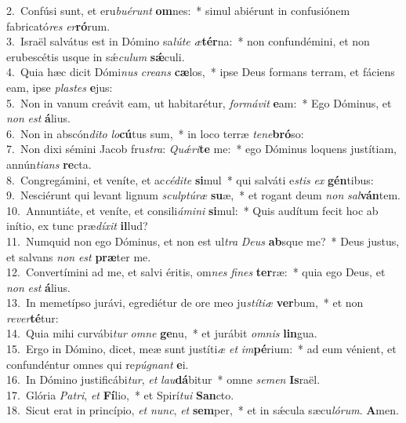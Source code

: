 {2.~}Confúsi sunt, et eru\textit{bu}\textit{é}\textit{runt} \textbf{om}nes:~* simul abiérunt in confusiónem fabricató\textit{res} \textit{er}\textbf{ró}rum.\\
{3.~}Israël salvátus est in Dómino sa\textit{lú}\textit{te} \textit{æ}\textbf{tér}na:~* non confundémini, et non erubescétis usque in sǽ\textit{cu}\textit{lum} \textbf{sǽ}culi.\\
{4.~}Quia hæc dicit Dómi\textit{nus} \textit{cre}\textit{ans} \textbf{cæ}los,~* ipse Deus formans terram, et fáciens eam, ipse \textit{pla}\textit{stes} \textbf{e}jus:\\
{5.~}Non in vanum creávit eam, ut habitarétur, \textit{for}\textit{má}\textit{vit} \textbf{e}am:~* Ego Dóminus, et \textit{non} \textit{est} \textbf{á}lius.\\
{6.~}Non in abscón\textit{di}\textit{to} \textit{lo}\textbf{cú}tus sum,~* in loco terræ \textit{te}\textit{ne}\textbf{bró}so:\\
{7.~}Non dixi sémini Jacob fru\textit{stra}: \textit{Quǽ}\textit{ri}\textbf{te} me:~* ego Dóminus loquens justítiam, annún\textit{ti}\textit{ans} \textbf{re}cta.\\
{8.~}Congregámini, et veníte, et ac\textit{cé}\textit{di}\textit{te} \textbf{si}mul~* qui salváti e\textit{stis} \textit{ex} \textbf{gén}tibus:\\
{9.~}Nesciérunt qui levant lignum \textit{scul}\textit{ptú}\textit{ræ} \textbf{su}æ,~* et rogant deum \textit{non} \textit{sal}\textbf{ván}tem.\\
{10.~}Annuntiáte, et veníte, et consili\textit{á}\textit{mi}\textit{ni} \textbf{si}mul:~* Quis audítum fecit hoc ab inítio, ex tunc præ\textit{dí}\textit{xit} \textbf{il}lud?\\
{11.~}Numquid non ego Dóminus, et non est ul\textit{tra} \textit{De}\textit{us} \textbf{ab}sque me?~* Deus justus, et salvans \textit{non} \textit{est} \textbf{præ}ter me.\\
{12.~}Convertímini ad me, et salvi éritis, om\textit{nes} \textit{fi}\textit{nes} \textbf{ter}ræ:~* quia ego Deus, et \textit{non} \textit{est} \textbf{á}lius.\\
{13.~}In memetípso jurávi, egrediétur de ore meo ju\textit{stí}\textit{ti}\textit{æ} \textbf{ver}bum,~* et non \textit{re}\textit{ver}\textbf{té}tur:\\
{14.~}Quia mihi curvábi\textit{tur} \textit{om}\textit{ne} \textbf{ge}nu,~* et jurábit \textit{om}\textit{nis} \textbf{lin}gua.\\
{15.~}Ergo in Dómino, dicet, meæ sunt justíti\textit{æ} \textit{et} \textit{im}\textbf{pé}rium:~* ad eum vénient, et confundéntur omnes qui re\textit{pú}\textit{gnant} \textbf{e}i.\\
{16.~}In Dómino justificábi\textit{tur}, \textit{et} \textit{lau}\textbf{dá}bitur~* omne \textit{se}\textit{men} \textbf{Is}raël.\\
{17.~}Glória \textit{Pa}\textit{tri}, \textit{et} \textbf{Fí}lio,~* et Spirí\textit{tu}\textit{i} \textbf{San}cto.\\
{18.~}Sicut erat in princípio, \textit{et} \textit{nunc}, \textit{et} \textbf{sem}per,~* et in sǽcula sæcu\textit{ló}\textit{rum}. \textbf{A}men.\\
